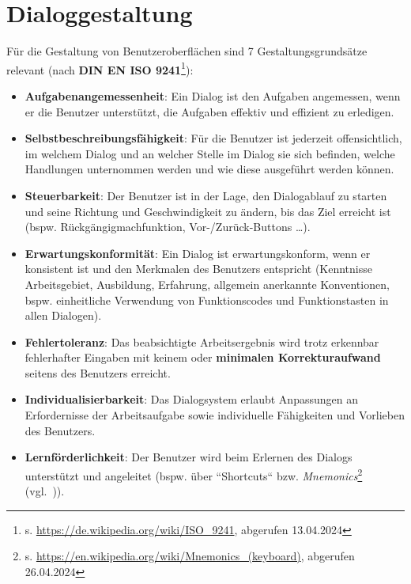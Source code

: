\section{Dialoggestaltung}

\begin{tcolorbox}[title=Grundsätze der Dialoggestaltung]
    Für die Gestaltung von Benutzeroberflächen sind 7 Gestaltungsgrundsätze relevant (nach \textbf{DIN EN ISO 9241}\footnote{
        s. \url{https://de.wikipedia.org/wiki/ISO_9241}, abgerufen 13.04.2024
    }):

    \begin{itemize}
        \item \textbf{Aufgabenangemessenheit}: Ein Dialog ist den Aufgaben angemessen, wenn er die Benutzer unterstützt, die Aufgaben effektiv und effizient zu erledigen.
        \item \textbf{Selbstbeschreibungsfähigkeit}: Für die Benutzer ist jederzeit offensichtlich, im welchem Dialog und an welcher Stelle im Dialog sie sich befinden, welche Handlungen unternommen werden und wie diese ausgeführt werden können.
        \item \textbf{Steuerbarkeit}: Der Benutzer ist in der Lage, den Dialogablauf zu starten und seine Richtung und Geschwindigkeit zu ändern, bis das Ziel erreicht ist (bspw. Rückgängigmachfunktion, Vor-/Zurück-Buttons \ldots).
        \item \textbf{Erwartungskonformität}: Ein Dialog ist erwartungskonform, wenn er konsistent ist und den Merkmalen des Benutzers entspricht (Kenntnisse Arbeitsgebiet, Ausbildung, Erfahrung, allgemein anerkannte Konventionen, bspw. einheitliche Verwendung von Funktionscodes und Funktionstasten in allen Dialogen).
        \item \textbf{Fehlertoleranz}: Das beabsichtigte Arbeitsergebnis wird trotz erkennbar fehlerhafter Eingaben mit keinem oder \textbf{minimalen Korrekturaufwand} seitens des Benutzers erreicht.
        \item \textbf{Individualisierbarkeit}: Das Dialogsystem erlaubt Anpassungen an Erfordernisse der Arbeitsaufgabe sowie individuelle Fähigkeiten und Vorlieben des Benutzers.
        \item \textbf{Lernförderlichkeit}: Der Benutzer wird beim Erlernen des Dialogs unterstützt und angeleitet (bspw. über ``Shortcuts`` bzw. \textit{Mnemonics}\footnote{
            s. \url{https://en.wikipedia.org/wiki/Mnemonics_(keyboard)}, abgerufen 26.04.2024
        } (vgl.~\cite[147]{Rau07f})).

    \end{itemize}
\end{tcolorbox}